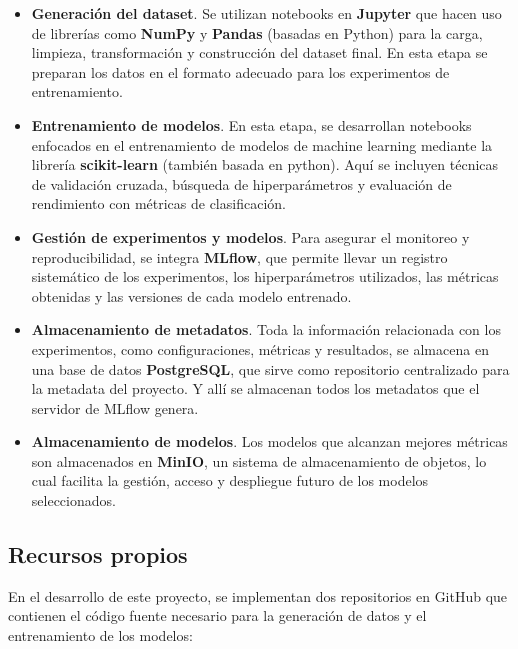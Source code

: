\documentclass[11pt,a4paper,spanish]{book}
\numberwithin{equation}{chapter}
\numberwithin{figure}{chapter}
\begin{document}
\begin{itemize}

\item \textbf{Generación del dataset}. Se utilizan notebooks en \textbf{Jupyter} que hacen uso de librerías como \textbf{NumPy} y \textbf{Pandas} (basadas en Python) para la carga, limpieza, transformación y construcción del dataset final. En esta etapa se preparan los datos en el formato adecuado para los experimentos de entrenamiento.


\item \textbf{Entrenamiento de modelos}. En esta etapa, se desarrollan notebooks enfocados en el entrenamiento de modelos de machine learning mediante la librería \textbf{scikit-learn} (también basada en python). Aquí se incluyen técnicas de validación cruzada, búsqueda de hiperparámetros y evaluación de rendimiento con métricas de clasificación.


\item \textbf{Gestión de experimentos y modelos}. Para asegurar el monitoreo y reproducibilidad, se integra \textbf{MLflow}, que permite llevar un registro sistemático de los experimentos, los hiperparámetros utilizados, las métricas obtenidas y las versiones de cada modelo entrenado.


\item \textbf{Almacenamiento de metadatos}.  Toda la información relacionada con los experimentos, como configuraciones, métricas y resultados, se almacena en una base de datos \textbf{PostgreSQL}, que sirve como repositorio centralizado para la metadata del proyecto. Y allí se almacenan todos los metadatos que el servidor de MLflow genera. 


\item \textbf{Almacenamiento de modelos}. Los modelos que alcanzan mejores métricas son almacenados en \textbf{MinIO}, un sistema de almacenamiento de objetos, lo cual facilita la gestión, acceso y despliegue futuro de los modelos seleccionados.

\end{itemize}


\subsection{Recursos propios}


En el desarrollo de este proyecto, se implementan dos repositorios en GitHub que contienen el código fuente necesario para la generación de datos y el entrenamiento de los modelos:
\end{document}
